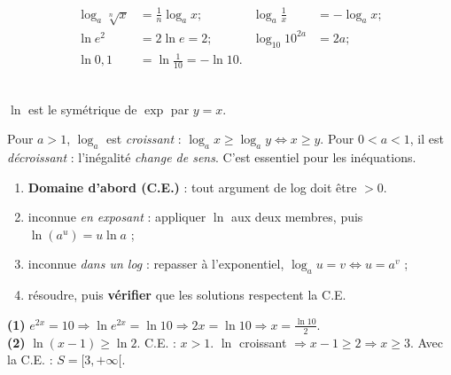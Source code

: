 \documentclass[11pt,a4paper]{article}
\begin{document}
\begin{minipage}{0.54\textwidth}
\begin{exemplebox}
\begin{align*}
\log_a\sqrt[n]{x}&=\tfrac1n\log_a x; & \log_a\tfrac1x&=-\log_a x;\\
\ln e^{2}&=2\ln e=2; & \log_{10}10^{2a}&=2a;\\
\ln 0{,}1&=\ln\tfrac{1}{10}=-\ln 10. &&
\end{align*}
\end{exemplebox}
\end{minipage}\hfill
\begin{minipage}{0.42\textwidth}
\centering
{}\\[-1mm]
{\scriptsize $\ln$ est le symétrique de $\exp$ par $y=x$.}
\end{minipage}

\begin{cle}[monotonie]
Pour $a>1$, $\log_a$ est \emph{croissant} : $\log_a x\geq\log_a y\iff x\geq y$. Pour $0<a<1$, il est
\emph{décroissant} : l'inégalité \emph{change de sens}. C'est essentiel pour les inéquations.
\end{cle}

\begin{methode}
\begin{enumerate}[leftmargin=1.8em,topsep=1pt,itemsep=1pt]
  \item \textbf{Domaine d'abord (C.E.)} : tout argument de log doit être $>0$.
  \item inconnue \emph{en exposant} : appliquer $\ln$ aux deux membres, puis $\ln(a^{u})=u\ln a$ ;
  \item inconnue \emph{dans un log} : repasser à l'exponentiel, $\log_a u=v\iff u=a^{v}$ ;
  \item résoudre, puis \textbf{vérifier} que les solutions respectent la C.E.
\end{enumerate}
\end{methode}

\begin{exemplebox}
\textbf{(1)} $e^{2x}=10\Rightarrow \ln e^{2x}=\ln 10\Rightarrow 2x=\ln 10\Rightarrow x=\tfrac{\ln 10}{2}.$\\
\textbf{(2)} $\ln(x-1)\geq\ln 2$. C.E. : $x>1$. $\ln$ croissant $\Rightarrow x-1\geq 2\Rightarrow x\geq 3$.
Avec la C.E. : $S=[3,+\infty[$.
\end{exemplebox}
\end{document}
